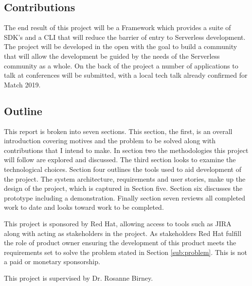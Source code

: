 \subsection{Contributions}
The end result of this project will be a Framework which provides a suite of \gls{SDK}'s and a \gls{CLI} that will reduce the barrier of entry to \gls{Serverless} development. The project will be developed in the open with the goal to build a community that will allow the development be guided by the needs of the \gls{Serverless} community as a whole. On the back of the project a number of applications to talk at conferences will be submitted, with a local tech talk already confirmed for Match 2019.


\subsection{Outline}
This report is broken into seven sections. This section, the first, is an overall introduction covering motives and the problem to be solved along with contributions that I intend to make. In section two the methodologies this project will follow are explored and discussed. The third section looks to examine the technological choices. Section four outlines the tools used to aid development of the project. The system architecture, requirements and user stories, make up the design of the project, which is captured in Section five. Section six discusses the prototype including a demonstration. Finally section seven reviews all completed work to date and looks toward work to be completed.

This project is sponsored by Red Hat, allowing access to tools such as \gls{JIRA} along with acting as stakeholders in the project. As stakeholders Red Hat fulfill the role of product owner ensuring the development of this product meets the requirements set to solve the problem stated in Section \ref{sub:problem}. This is not a paid or monetary sponsorship.

This project is supervised by Dr. Rosanne Birney.